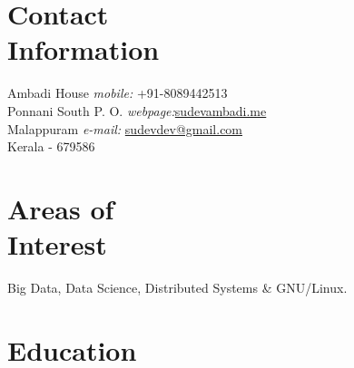 \documentclass[margin,line]{resume}
\begin{document}
\begin{resume}

    \section{\mysidestyle Contact\\Information}
    
        
    Ambadi House   \hfill \textit{mobile:} \hspace{9mm} 		+91-8089442513 \\ 
    Ponnani South P. O.	\hfill \textit{webpage:}\hspace{14mm}\href{http://sudev.github.io}{sudevambadi.me}\\
    Malappuram \hfill 	\textit{e-mail:} \hspace{3.6mm}\href{mailto:sudevdev@gmail.com}{sudevdev@gmail.com}     \\
    Kerala - 679586
			
        \vspace{-2.5mm}
        
        \vspace{3mm}
%
					
    \section{\mysidestyle Areas of\\Interest}

   Big Data, Data Science, Distributed Systems \& GNU/Linux.
\vspace{3mm}


    \section{\mysidestyle Education}


\end{resume}
\end{document}
